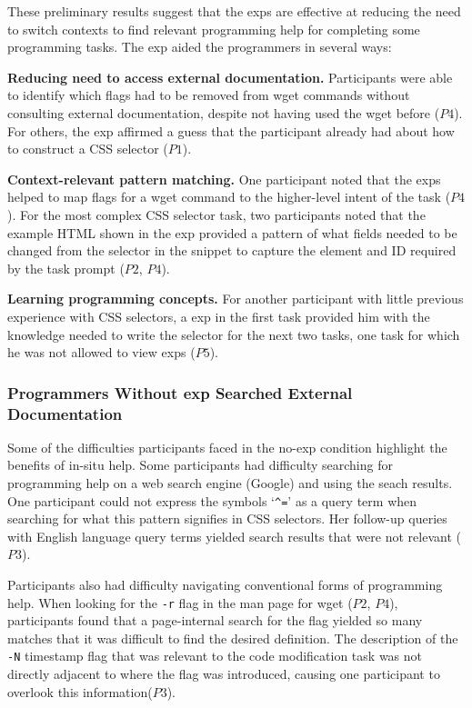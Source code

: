 

These preliminary results suggest that the \glspl{exp} are effective at reducing the need to switch contexts to find relevant programming help  for completing some programming tasks. 
The \gls{exp} aided the programmers in several ways:

{\bf Reducing need to access external documentation.}
Participants were  able to identify which flags had to be removed from wget commands without consulting external documentation, despite not having used the wget before ($P4$).
For others, the \gls{exp} affirmed a guess that the participant already had about how to construct a CSS selector ($P1$).

{\bf Context-relevant pattern matching.}
One participant noted that the \glspl{exp} helped  to map flags for a wget command to the higher-level intent of the task ($P4$). 
For the most complex CSS selector task, two participants noted
that the example HTML shown in the \gls{exp} 
provided a pattern of what fields needed to be changed  from the selector in the snippet to capture the element and ID required by the task prompt ($P2$, $P4$).

{\bf Learning programming concepts.}
For another participant with little previous experience with CSS selectors, a \gls{exp} in  the first task provided him with the knowledge needed to write the selector for the next two tasks, one task for which he was not allowed to view \glspl{exp} ($P5$).

\subsubsection{Programmers Without \Gls{exp} Searched External Documentation}

Some of the difficulties participants faced in the no-\gls{exp} condition  highlight the benefits of in-situ help.
Some participants had difficulty searching for programming help on a web search engine (Google) and using the seach results.
One participant could not express the symbols `\texttt{\^{}=}' as a query term when searching for what  this pattern signifies in CSS selectors.
Her follow-up queries with English language query terms  yielded search results that were not relevant ($P3$).

Participants also had difficulty navigating conventional forms of programming help.
When looking for the \texttt{-r} flag in the man page for wget ($P2$, $P4$), participants found that a page-internal  search for the flag yielded so many matches that it was difficult to find the desired definition.
The description of the \texttt{-N} timestamp flag that was relevant to the code modification task was not directly adjacent to where the flag was introduced, causing one participant to overlook this information($P3$).

